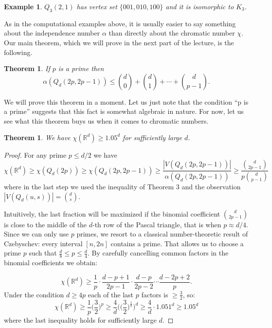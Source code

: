 \documentclass[a4paper]{article}
\theoremstyle{plain}
\newtheorem{theorem}[lemma]{Theorem}
\theoremstyle{myremark}
\newtheorem{example}[lemma]{Example}
\newcommand{\RR}{\mathbb{R}}
\begin{document}
\begin{example}
$Q_3(2,1)$ has vertex set $\{001,010,100\}$ and it is isomorphic to $K_3$.
\end{example}

As in the computational examples above, it is usually easier to say something about the independence number $\alpha$ than directly about the chromatic number $\chi$. Our main theorem, which we will prove in the next part of the lecture, is the following.

\begin{theorem}
If $p$ is a prime then 
$$\alpha(Q_d(2p,2p-1))\leq {d\choose 0}+{d\choose 1}+\cdots+{d\choose p-1}.$$
\end{theorem}

We will prove this theorem in a moment. Let us just note that the condition ``p is a prime'' suggests that this fact is somewhat algebraic in nature. For now, let us see what this theorem buys us when it comes to chromatic numbers.

\begin{theorem}
We have $\chi(\RR^d)\geq 1.05^d$ for sufficiently large $d$.
\end{theorem}
\begin{proof}
For any prime $p\leq d/2$ we have
$$\chi(\RR^d)\geq\chi(Q_d(2p))\geq\chi(Q_d(2p,2p-1))\geq
\frac{|V(Q_d(2p,2p-1))|}{\alpha(Q_d(2p,2p-1))}\geq \frac{{d\choose 2p-1}}{p{d\choose p-1}}$$
where in the last step we used the inequality of Theorem 3 and the observation $|V(Q_d(u,s))|={d\choose s}$.

Intuitively, the last fraction will be maximized if the binomial coefficient ${d\choose 2p-1}$ is close to the middle of the $d$-th row of the Pascal triangle, that is when $p\approx d/4$. Since we can only use $p$ primes, we resort to a classical number-theoretic result of Czebyschev: every interval $[n,2n]$ contains a prime. That allows us to choose a prime $p$ such that $\frac{d}{8}\leq p\leq \frac{d}{4}$. By carefully cancelling common factors in the binomial coefficients we obtain:

$$\chi(\RR^d)\geq \frac{1}{p}\cdot\frac{d-p+1}{2p-1}\cdot\frac{d-p}{2p-2}\cdots\frac{d-2p+2}{p}.$$
Under the condition $d\geq 4p$ each of the last $p$ factors is $\geq \frac{3}{2}$, so:
$$\chi(\RR^d)\geq\frac{1}{p}\Big(\frac{3}{2}\Big)^p\geq\frac{4}{d}\Big(\Big(\frac{3}{2}\Big)^{\frac{1}{8}}\Big)^d\geq \frac{4}{d}\cdot 1.051^d\geq 1.05^d$$
where the last inequality holds for sufficiently large $d$.
\end{proof}
\end{document}
